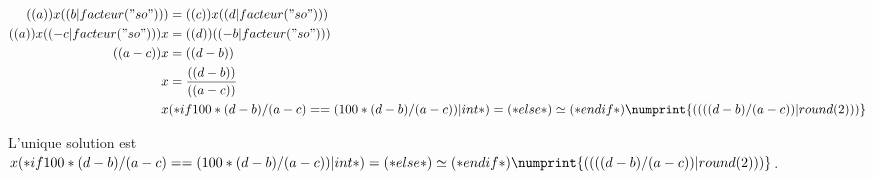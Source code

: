 \exercice*

\begin{align*}
  (( a )) x (( b|facteur("so") )) &= (( c )) x (( d|facteur("so") )) \\
  (( a )) x (( -c|facteur("so") ))x &= (( d )) (( -b|facteur("so") )) \\
  (( a - c )) x &= (( d - b )) \\
  x &= \frac{(( d - b ))}{(( a - c ))} \\
  x &
        (* if 100*(d-b)/(a-c) == (100*(d-b)/(a-c))|int *)
            =
        (* else *)
            \simeq
        (* endif *)
        \numprint{(( ((d-b)/(a-c)) | round(2) ))}
\end{align*}

L'unique solution est
$x
(* if 100*(d-b)/(a-c) == (100*(d-b)/(a-c))|int *)
    =
(* else *)
    \simeq
(* endif *)
\numprint{(( ((d-b)/(a-c)) | round(2) ))}$.
